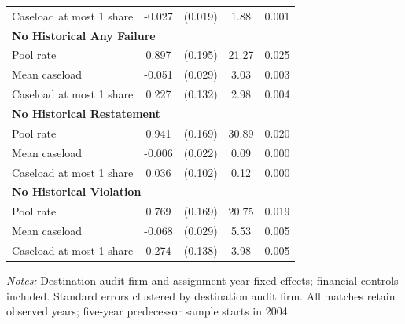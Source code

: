 \documentclass[10pt]{article}
\begin{document}
\begin{minipage}{19cm}
\begin{threeparttable}
\begin{tabular}{p{}cccc}
Caseload at most 1 share & -0.027 & (0.019) & 1.88 & 0.001 \\
\multicolumn{5}{l}{\textbf{No Historical Any Failure}} \\
Pool rate & 0.897 & (0.195) & 21.27 & 0.025 \\
Mean caseload & -0.051 & (0.029) & 3.03 & 0.003 \\
Caseload at most 1 share & 0.227 & (0.132) & 2.98 & 0.004 \\
\multicolumn{5}{l}{\textbf{No Historical Restatement}} \\
Pool rate & 0.941 & (0.169) & 30.89 & 0.020 \\
Mean caseload & -0.006 & (0.022) & 0.09 & 0.000 \\
Caseload at most 1 share & 0.036 & (0.102) & 0.12 & 0.000 \\
\multicolumn{5}{l}{\textbf{No Historical Violation}} \\
Pool rate & 0.769 & (0.169) & 20.75 & 0.019 \\
Mean caseload & -0.068 & (0.029) & 5.53 & 0.005 \\
Caseload at most 1 share & 0.274 & (0.138) & 3.98 & 0.005 \\
\bottomrule
\end{tabular}
\begin{tablenotes}\fontsize{9}{11}\selectfont
\item \raggedright \fontsize{9}{11}\selectfont \textit{Notes:} Destination audit-firm and assignment-year fixed effects; financial controls included. Standard errors clustered by destination audit firm. All matches retain observed years; five-year predecessor sample starts in 2004.
\end{tablenotes}
\end{threeparttable}

\end{minipage}
\end{document}
